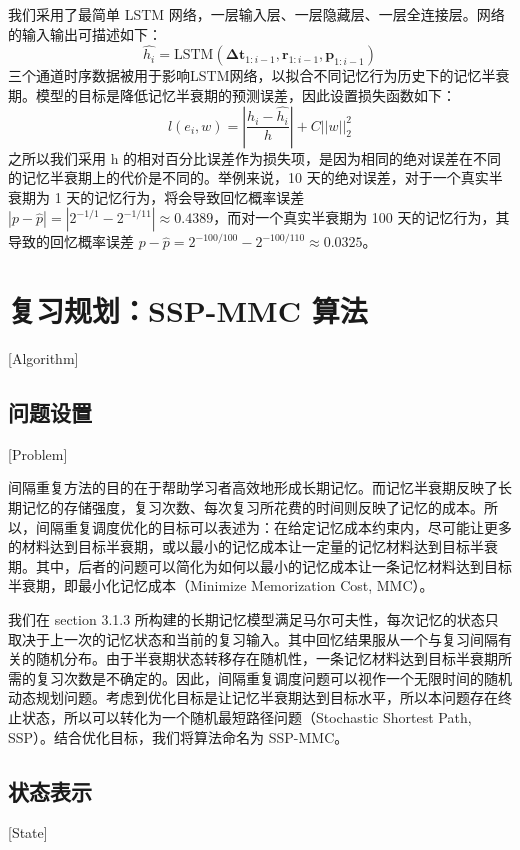 我们采用了最简单 LSTM 网络，一层输入层、一层隐藏层、一层全连接层。网络的输入输出可描述如下：
\begin{equation}
\hat{h_i}=\mathrm{LSTM}(\boldsymbol{\Delta t}_{1:i-1}, \boldsymbol r_{1:i-1}, \boldsymbol p_{1:i-1})
\end{equation}
三个通道时序数据被用于影响LSTM网络，以拟合不同记忆行为历史下的记忆半衰期。模型的目标是降低记忆半衰期的预测误差，因此设置损失函数如下：
\begin{equation}
l(e_i,w)=|\frac{h_i-\hat{h_i}}{h}|+C||w||_{2}^{2}
\end{equation}
之所以我们采用 h 的相对百分比误差作为损失项，是因为相同的绝对误差在不同的记忆半衰期上的代价是不同的。举例来说，10 天的绝对误差，对于一个真实半衰期为 1 天的记忆行为，将会导致回忆概率误差 $|p-\hat{p}|=|2^{-1/1}-2^{-1/11}|\approx 0.4389$，而对一个真实半衰期为 100 天的记忆行为，其导致的回忆概率误差 $p-\hat{p}=2^{-100/100}-2^{-100/110}\approx 0.0325$。

\section{复习规划：SSP-MMC 算法}[Algorithm]

\subsection{问题设置}[Problem]

间隔重复方法的目的在于帮助学习者高效地形成长期记忆。而记忆半衰期反映了长期记忆的存储强度，复习次数、每次复习所花费的时间则反映了记忆的成本。所以，间隔重复调度优化的目标可以表述为：在给定记忆成本约束内，尽可能让更多的材料达到目标半衰期，或以最小的记忆成本让一定量的记忆材料达到目标半衰期。其中，后者的问题可以简化为如何以最小的记忆成本让一条记忆材料达到目标半衰期，即最小化记忆成本（Minimize Memorization Cost, MMC）。

我们在 section 3.1.3 所构建的长期记忆模型满足马尔可夫性，每次记忆的状态只取决于上一次的记忆状态和当前的复习输入。其中回忆结果服从一个与复习间隔有关的随机分布。由于半衰期状态转移存在随机性，一条记忆材料达到目标半衰期所需的复习次数是不确定的。因此，间隔重复调度问题可以视作一个无限时间的随机动态规划问题。考虑到优化目标是让记忆半衰期达到目标水平，所以本问题存在终止状态，所以可以转化为一个随机最短路径问题（Stochastic Shortest Path, SSP）。结合优化目标，我们将算法命名为 SSP-MMC。

\subsection{状态表示}[State]

